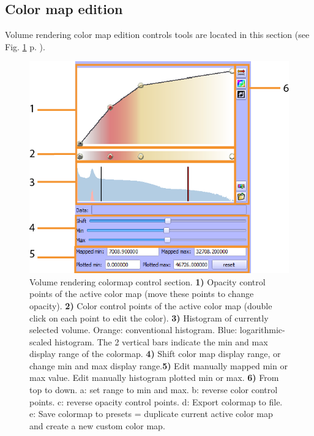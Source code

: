 \subsection{Color map edition}
Volume rendering color map edition controls tools are located in this section (see Fig. \ref{volume_colormap} p. \pageref{volume_colormap}). 
\begin{figure}
  \centering
  \includegraphics[scale=1]{images/14/volume_colormap2.png}
\caption{Volume rendering colormap control section. \textbf{1)} Opacity control points of the active color map (move these points to change opacity). \textbf{2)} Color control points of the active color map (double click on each point to edit the color). \textbf{3)} Histogram of currently selected volume. Orange: conventional histogram. Blue: logarithmic-scaled histogram. The 2 vertical bars indicate the min and max display range of the colormap.  \textbf{4)} Shift color map display range, or change min and max display range.\textbf{5)} Edit manually mapped min or max value. Edit manually histogram plotted min or max. \textbf{6)} From top to down. a: set range to min and max. b: reverse color control points. c: reverse opacity control points. d: Export colormap to file. e: Save colormap to presets = duplicate current active color map and create a new custom color map.}	
\label{volume_colormap}
 \end{figure}

